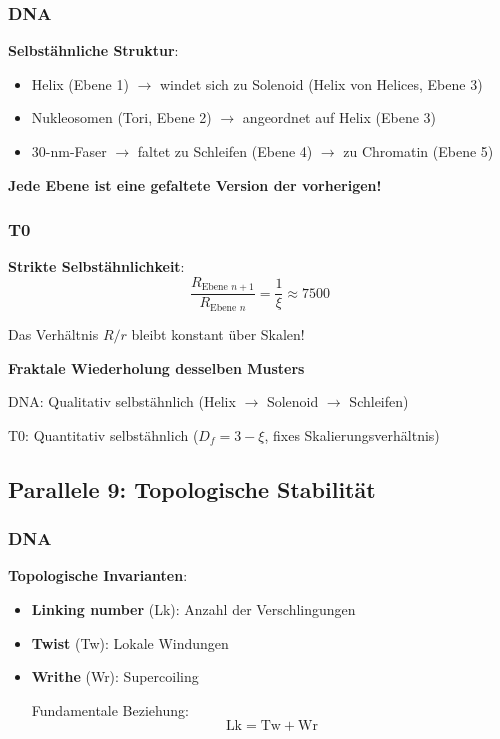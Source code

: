 	\subsubsection{DNA}
	
	\textbf{Selbstähnliche Struktur}:
	\begin{itemize}
		\item Helix (Ebene 1) $\to$ windet sich zu Solenoid (Helix von Helices, Ebene 3)
		\item Nukleosomen (Tori, Ebene 2) $\to$ angeordnet auf Helix (Ebene 3)
		\item 30-nm-Faser $\to$ faltet zu Schleifen (Ebene 4) $\to$ zu Chromatin (Ebene 5)
	\end{itemize}
	
	\textbf{Jede Ebene ist eine gefaltete Version der vorherigen!}
	
	\subsubsection{T0}
	
	\textbf{Strikte Selbstähnlichkeit}:
	\begin{equation}
		\frac{R_{\text{Ebene } n+1}}{R_{\text{Ebene } n}} = \frac{1}{\xi} \approx 7500
	\end{equation}
	
	Das Verhältnis $R/r$ bleibt konstant über Skalen!
	
	\begin{keyresult}
		\textbf{Fraktale Wiederholung desselben Musters}
		
		DNA: Qualitativ selbstähnlich (Helix $\to$ Solenoid $\to$ Schleifen)
		
		T0: Quantitativ selbstähnlich ($D_f = 3-\xi$, fixes Skalierungsverhältnis)
	\end{keyresult}
	
	\subsection{Parallele 9: Topologische Stabilität}
	
	\subsubsection{DNA}
	
	\textbf{Topologische Invarianten}:
	
	\begin{itemize}
		\item \textbf{Linking number} (Lk): Anzahl der Verschlingungen
		\item \textbf{Twist} (Tw): Lokale Windungen
		\item \textbf{Writhe} (Wr): Supercoiling
		
		Fundamentale Beziehung:
		\begin{equation}
			\text{Lk} = \text{Tw} + \text{Wr}
		\end{equation}
	\end{itemize}
	
